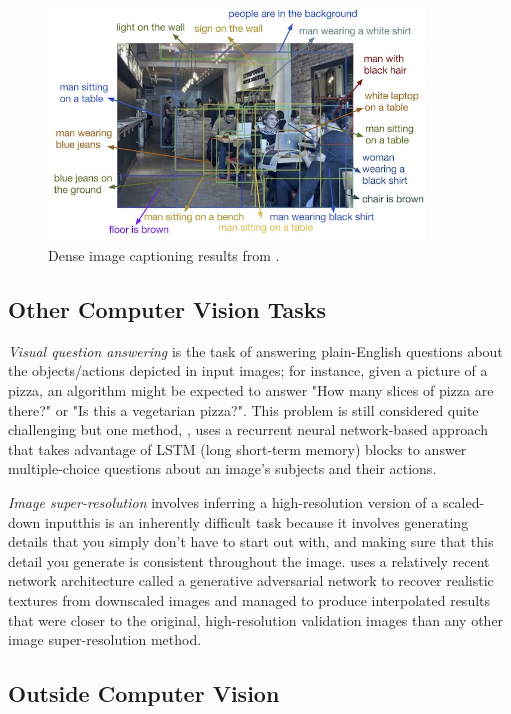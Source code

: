 \documentclass{article}
\begin{document}
\begin{figure}[h]
\includegraphics[width=10cm]{densecap.png}
\centering
\caption{Dense image captioning results from  \cite{densecap}.}
\end{figure}

\subsection{Other Computer Vision Tasks}

\textit{Visual question answering} is the task of answering plain-English questions about the objects/actions depicted in input images; for instance, given a picture of a pizza, an algorithm might be expected to answer "How many slices of pizza are there?" or "Is this a vegetarian pizza?". This problem is still considered quite challenging but one method, \cite{vqa}, uses a recurrent neural network-based approach that takes advantage of LSTM (long short-term memory) blocks to answer multiple-choice questions about an image's subjects and their actions.

\textit{Image super-resolution} involves inferring a high-resolution version of a scaled-down input\textemdash this is an inherently difficult task because it involves generating details that you simply don't have to start out with, and making sure that this detail you generate is consistent throughout the image. \cite{superres} uses a relatively recent network architecture called a generative adversarial network to recover realistic textures from downscaled images and managed to produce interpolated results that were closer to the original, high-resolution validation images than any other image super-resolution method.

\subsection{Outside Computer Vision}
\end{document}
